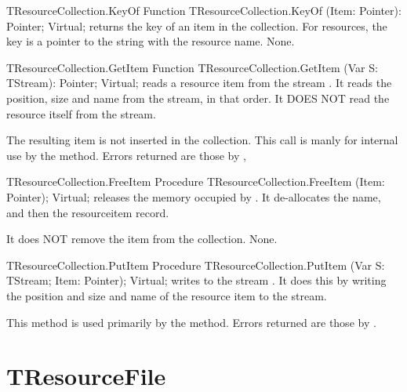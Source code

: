 \begin{function}{TResourceCollection.KeyOf}
\Declaration
Function TResourceCollection.KeyOf (Item: Pointer): Pointer; Virtual;
\Description
{} returns the key of an item in the collection. For resources, the
key is a pointer to the string with the resource name.
\Errors
None.
\SeeAlso
{}
\end{function}

\begin{function}{TResourceCollection.GetItem}
\Declaration
Function TResourceCollection.GetItem (Var S: TStream): Pointer; Virtual;
\Description
{} reads a resource item from the stream . It reads the
position, size and name from the stream, in that order. It DOES NOT read the
resource itself from the stream.

The resulting item is not inserted in the collection. This call is manly for
internal use by the  method.
\Errors
Errors returned are those by 
\SeeAlso
{}, 
\end{function}

\begin{procedure}{TResourceCollection.FreeItem}
\Declaration
Procedure TResourceCollection.FreeItem (Item: Pointer); Virtual;
\Description
{} releases the memory occupied by . It de-allocates
the name, and then the resourceitem record.

It does NOT remove the item from the collection.
\Errors
None.
\SeeAlso
{}
\end{procedure}

\begin{procedure}{TResourceCollection.PutItem}
\Declaration
Procedure TResourceCollection.PutItem (Var S: TStream; Item: Pointer); Virtual;
\Description
{} writes  to the stream . It does this by
writing the position and size and name of the resource item to the stream.

This method is used primarily by the 
method.
\Errors
Errors returned are those by .
\SeeAlso
{}
\end{procedure}


\section{TResourceFile}
\label{se:TResourceFile}

